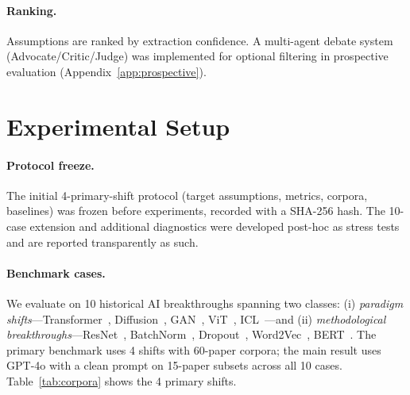 \documentclass[11pt]{article}
\begin{document}
\paragraph{Ranking.}
Assumptions are ranked by extraction confidence. A multi-agent debate system (Advocate/Critic/Judge) was implemented for optional filtering in prospective evaluation (Appendix~\ref{app:prospective}).

\section{Experimental Setup}

\paragraph{Protocol freeze.}
The initial 4-primary-shift protocol (target assumptions, metrics, corpora, baselines) was frozen before experiments, recorded with a SHA-256 hash. The 10-case extension and additional diagnostics were developed post-hoc as stress tests and are reported transparently as such.

\paragraph{Benchmark cases.}
We evaluate on 10 historical AI breakthroughs spanning two classes: (i) \emph{paradigm shifts}---Transformer~\cite{vaswani2017attention}, Diffusion~\cite{ho2020denoising}, GAN~\cite{goodfellow2014generative}, ViT~\cite{dosovitskiy2021image}, ICL~\cite{brown2020language}---and (ii) \emph{methodological breakthroughs}---ResNet~\cite{he2016deep}, BatchNorm~\cite{ioffe2015batch}, Dropout~\cite{srivastava2014dropout}, Word2Vec~\cite{mikolov2013distributed}, BERT~\cite{devlin2019bert}. The primary benchmark uses 4 shifts with 60-paper corpora; the main result uses GPT-4o with a clean prompt on 15-paper subsets across all 10 cases. Table~\ref{tab:corpora} shows the 4 primary shifts.

\begin{table}[t]
\centering
\caption{Primary paradigm shifts and pre-shift corpora.}
\label{tab:corpora}
\footnotesize
\setlength{\tabcolsep}{3pt}
\end{table}
\end{document}

